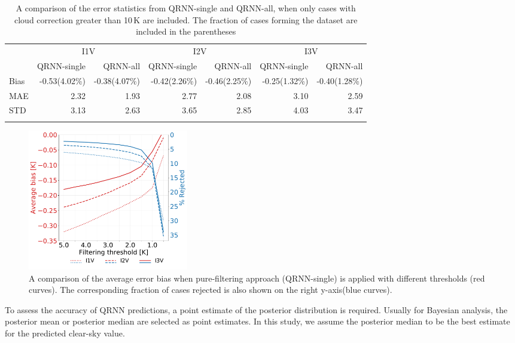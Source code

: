 \documentclass[amt, manuscript]{copernicus}
\begin{document}
\begin{table}[t]
	\caption{A comparison of the error statistics from QRNN-single and QRNN-all, when only cases with cloud correction greater than 10\,K are included. The fraction of cases forming the dataset are included in the parentheses}
	\label{tab:error_statistics_ici_high_cloud_impact}
	\begin{tabular}{lrr|rr|rr}
		\tophline
		&\multicolumn{2}{c|}{I1V}& \multicolumn{2}{c|}{I2V} & \multicolumn{2}{c}{I3V}\\
		\cline{2-7}
		&QRNN-single& QRNN-all & QRNN-single & QRNN-all  & QRNN-single & QRNN-all\\
		\middlehline
				    Bias     & -0.53(4.02\%) & -0.38(4.07\%)  & -0.42(2.26\%) & -0.46(2.25\%) & -0.25(1.32\%) & -0.40(1.28\%) \\
					MAE      &  2.32 &  1.93  &  2.77 &  2.08 &  3.10 &  2.59 \\
					STD      &  3.13 &  2.63  &  3.65 &  2.85 &  4.03 &  3.47 \\
		\bottomhline
	\end{tabular}
	\belowtable{} %
\end{table}


\begin{figure}[t]
	\includegraphics[width=70mm]{Figures/different_filtering_thresholds.pdf} 
	\caption{A comparison of the  average error bias when pure-filtering approach (QRNN-single) is applied with different thresholds (red curves). The corresponding fraction of cases rejected is also shown on the right y-axis(blue curves).}
	\label{fig:filtering_thresholds}	
\end{figure} 
To assess the accuracy of QRNN predictions, a point estimate of the posterior distribution is required. Usually for Bayesian analysis, the posterior mean or posterior median are selected as point estimates. In this study, we assume the posterior median to be the best estimate for the predicted clear-sky value. 
\end{document}
